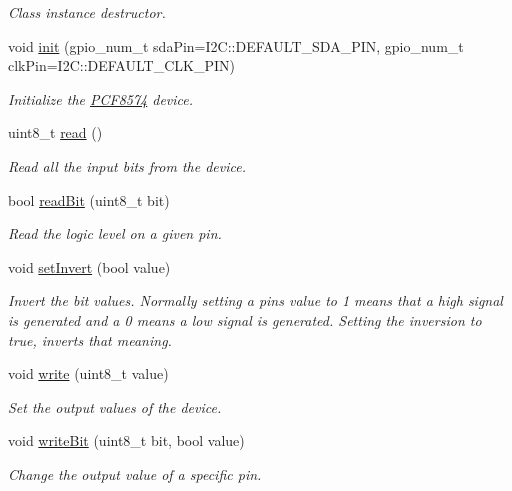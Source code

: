 \begin{DoxyCompactItemize}
\begin{DoxyCompactList}\small\item\em Class instance destructor. \end{DoxyCompactList}\item 
void \hyperlink{class_p_c_f8574_abfe627fd97523863fa0075422b0158b6}{init} (gpio\+\_\+num\+\_\+t sda\+Pin=I2\+C\+::\+D\+E\+F\+A\+U\+L\+T\+\_\+\+S\+D\+A\+\_\+\+P\+IN, gpio\+\_\+num\+\_\+t clk\+Pin=I2\+C\+::\+D\+E\+F\+A\+U\+L\+T\+\_\+\+C\+L\+K\+\_\+\+P\+IN)
\begin{DoxyCompactList}\small\item\em Initialize the \hyperlink{class_p_c_f8574}{P\+C\+F8574} device. \end{DoxyCompactList}\item 
uint8\+\_\+t \hyperlink{class_p_c_f8574_a90a8a8c48e0530c7371dacabc1f6a282}{read} ()
\begin{DoxyCompactList}\small\item\em Read all the input bits from the device. \end{DoxyCompactList}\item 
bool \hyperlink{class_p_c_f8574_a4e484981cdf6451bb36a13f9d3a60400}{read\+Bit} (uint8\+\_\+t bit)
\begin{DoxyCompactList}\small\item\em Read the logic level on a given pin. \end{DoxyCompactList}\item 
void \hyperlink{class_p_c_f8574_a9663079a19f252a5edc2471f384bc28b}{set\+Invert} (bool value)
\begin{DoxyCompactList}\small\item\em Invert the bit values. Normally setting a pin\textquotesingle{}s value to 1 means that a high signal is generated and a 0 means a low signal is generated. Setting the inversion to true, inverts that meaning. \end{DoxyCompactList}\item 
void \hyperlink{class_p_c_f8574_a5d51dcc9e396c431561b8a0b044a9e6b}{write} (uint8\+\_\+t value)
\begin{DoxyCompactList}\small\item\em Set the output values of the device. \end{DoxyCompactList}\item 
void \hyperlink{class_p_c_f8574_a0d2f2b79548651b4fc40faefdc7156b0}{write\+Bit} (uint8\+\_\+t bit, bool value)
\begin{DoxyCompactList}\small\item\em Change the output value of a specific pin. \end{DoxyCompactList}\end{DoxyCompactItemize}


